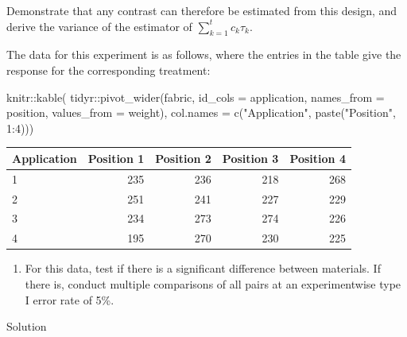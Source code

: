 \documentclass[
]{book}
\newenvironment{Shaded}{\begin{snugshade}}{\end{snugshade}}
\newcommand{\AttributeTok}[1]{\textcolor[rgb]{0.77,0.63,0.00}{#1}}
\newcommand{\DecValTok}[1]{\textcolor[rgb]{0.00,0.00,0.81}{#1}}
\newcommand{\FunctionTok}[1]{\textcolor[rgb]{0.00,0.00,0.00}{#1}}
\newcommand{\NormalTok}[1]{#1}
\newcommand{\SpecialCharTok}[1]{\textcolor[rgb]{0.00,0.00,0.00}{#1}}
\newcommand{\StringTok}[1]{\textcolor[rgb]{0.31,0.60,0.02}{#1}}
\providecommand{\tightlist}{%
  \setlength{\itemsep}{0pt}\setlength{\parskip}{0pt}}
\theoremstyle{definition}
\theoremstyle{definition}
\theoremstyle{definition}
\theoremstyle{definition}
\theoremstyle{remark}
\begin{document}
\begin{enumerate}
\begin{enumerate}
    Demonstrate that any contrast can therefore be estimated from this design, and derive the variance of the estimator of \(\sum_{k=1}^tc_k\tau_k\).
  \end{enumerate}

  The data for this experiment is as follows, where the entries in the table give the response for the corresponding treatment:

\begin{Shaded}
\begin{Highlighting}[]
\NormalTok{knitr}\SpecialCharTok{::}\FunctionTok{kable}\NormalTok{(}
\NormalTok{ tidyr}\SpecialCharTok{::}\FunctionTok{pivot\_wider}\NormalTok{(fabric, }\AttributeTok{id\_cols =}\NormalTok{ application, }\AttributeTok{names\_from =}\NormalTok{ position, }
                \AttributeTok{values\_from =}\NormalTok{ weight),}
 \AttributeTok{col.names =} \FunctionTok{c}\NormalTok{(}\StringTok{"Application"}\NormalTok{, }\FunctionTok{paste}\NormalTok{(}\StringTok{"Position"}\NormalTok{, }\DecValTok{1}\SpecialCharTok{:}\DecValTok{4}\NormalTok{)))}
\end{Highlighting}
\end{Shaded}

  \begin{tabular}{l|r|r|r|r}
   \hline
   Application & Position 1 & Position 2 & Position 3 & Position 4\\
   \hline
   1 & 235 & 236 & 218 & 268\\
   \hline
   2 & 251 & 241 & 227 & 229\\
   \hline
   3 & 234 & 273 & 274 & 226\\
   \hline
   4 & 195 & 270 & 230 & 225\\
   \hline
   \end{tabular}

  \begin{enumerate}
  \def\labelenumii{\alph{enumii}.}
  \setcounter{enumii}{2}
  \tightlist
  \item
    For this data, test if there is a significant difference between materials. If there is, conduct multiple comparisons of all pairs at an experimentwise type I error rate of 5\%.
  \end{enumerate}
\end{enumerate}

Solution
\end{document}
